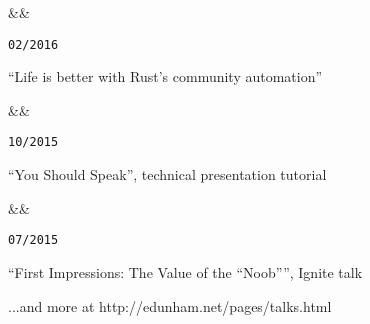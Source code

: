 \documentclass[11pt]{article} %
\newcommand{\squish}{
    \setlength{\itemsep}{0.5pt}
    \setlength{\parskip}{0pt} %
    \setlength{\parsep}{0.5pt}
}
\newcommand{\when}[1]{
    \hfill \texttt{#1}
}
\newcommand{\experience}[3]{
    \ifx&#2&
        \item[{#1}]
    \else
        \item[{#1}, \emph{#2}]
    \fi
    \when{#3}
}
\begin{document}
\begin{description}
\squish

\experience{Linux.Conf.Au}
           {}
           {02/2016}

    ``Life is better with Rust's community automation''

\experience{SeaGL}
           {}
           {10/2015}

    ``You Should Speak'', technical presentation tutorial

\experience{O'Reilly OSCON}
           {}
           {07/2015}

    ``First Impressions: The Value of the ``Noob'''', Ignite talk

%

%

%

%

%

%

%

\hfill \small ...and more at http://edunham.net/pages/talks.html

\end{description}
\end{document}
